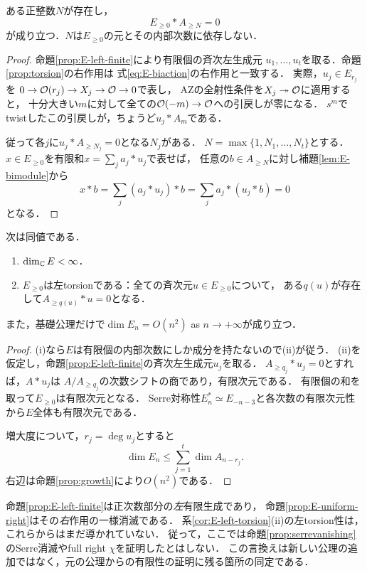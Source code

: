 \documentclass[11pt,a4paper]{ltjsarticle}
\begin{document}
\begin{proposition}[一様な右消滅指数]\label{prop:E-uniform-right}
ある正整数$N$が存在し，
\begin{equation}\label{eq:E-uniform-right}
 E_{\geq0}*A_{\geq N}=0
\end{equation}
が成り立つ．$N$は$E_{\geq0}$の元とその内部次数に依存しない．
\end{proposition}
\begin{proof}
命題\ref{prop:E-left-finite}により有限個の斉次左生成元
$u_1,\dots,u_t$を取る．命題\ref{prop:torsion}の右作用は
式\eqref{eq:E-biaction}の右作用と一致する．
実際，$u_j\in E_{r_j}$を
$0\to\mathcal O(r_j)\to X_j\to\mathcal O\to0$で表し，
AZの全射性条件を$X_j\twoheadrightarrow\mathcal O$に適用すると，
十分大きい$m$に対して全ての$\mathcal O(-m)\to\mathcal O$への引戻しが零になる．
$s^m$でtwistしたこの引戻しが，ちょうど$u_j*A_m$である．

従って各$j$に$u_j*A_{\geq N_j}=0$となる$N_j$がある．
$N=\max\{1,N_1,\dots,N_t\}$とする．
$x\in E_{\geq0}$を有限和$x=\sum_j a_j*u_j$で表せば，
任意の$b\in A_{\geq N}$に対し補題\ref{lem:E-bimodule}から
\[
 x*b=\sum_j(a_j*u_j)*b
     =\sum_j a_j*(u_j*b)=0
\]
となる．
\end{proof}

\begin{corollary}[残る有限性の左右差]\label{cor:E-left-torsion}
次は同値である．
\begin{enumerate}[label=(\roman*)]
\item $\dim_\mathbb C E<\infty$．
\item $E_{\geq0}$は左torsionである：全ての斉次元$u\in E_{\geq0}$について，
ある$q(u)$が存在して$A_{\geq q(u)}*u=0$となる．
\end{enumerate}
また，基礎公理だけで$\dim E_n=O(n^2)$ as $n\to+\infty$が成り立つ．
\end{corollary}
\begin{proof}
(i)なら$E$は有限個の内部次数にしか成分を持たないので(ii)が従う．
(ii)を仮定し，命題\ref{prop:E-left-finite}の斉次左生成元$u_j$を取る．
$A_{\geq q_j}*u_j=0$とすれば，$A*u_j$は
$A/A_{\geq q_j}$の次数シフトの商であり，有限次元である．
有限個の和を取って$E_{\geq0}$は有限次元となる．
Serre対称性$E_n^*\simeq E_{-n-3}$と各次数の有限次元性から$E$全体も有限次元である．

増大度について，$r_j=\deg u_j$とすると
\[
 \dim E_n\leq\sum_{j=1}^t\dim A_{n-r_j}.
\]
右辺は命題\ref{prop:growth}により$O(n^2)$である．
\end{proof}

\begin{remark}\label{rem:E-sides-gap}
命題\ref{prop:E-left-finite}は正次数部分の\emph{左}有限生成であり，
命題\ref{prop:E-uniform-right}はその\emph{右}作用の一様消滅である．
系\ref{cor:E-left-torsion}(ii)の左torsion性は，これらからはまだ導かれていない．
従って，ここでは命題\ref{prop:serrevanishing}のSerre消滅やfull right $\chi$を証明したとはしない．
この言換えは新しい公理の追加ではなく，元の公理からの有限性の証明に残る箇所の同定である．
\end{remark}
\end{document}
